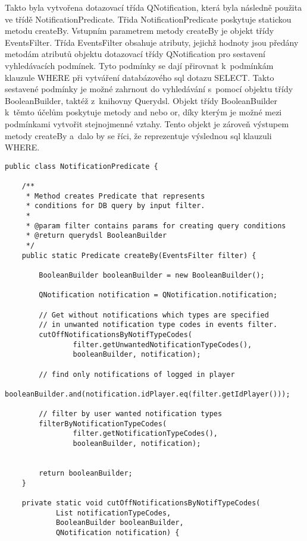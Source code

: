 \documentclass[12pt]{article}
\begin{document}
{Takto byla vytvořena dotazovací třída QNotification,
která byla následně použita ve třídě NotificationPredicate.
Třida NotificationPredicate poskytuje statickou metodu createBy.
Vstupním parametrem metody createBy je objekt třídy EventsFilter. 
Třída EventsFilter obsahuje atributy, jejichž hodnoty jsou předány metodám atributů objektu
dotazovací třídy QNotification pro sestavení vyhledávacích podmínek.
Tyto podmínky se dají přirovnat k~podmínkám klauzule WHERE při vytváření databázového sql dotazu SELECT.
Takto sestavené podmínky je možné zahrnout do vyhledávání s~pomocí objektu třídy BooleanBuilder, taktéž z~knihovny Querydsl.
Objekt třídy BooleanBuilder k~těmto účelům poskytuje metody and nebo or, 
díky kterým je možné mezi podmínkami vytvořit stejnojmenné vztahy.
Tento objekt je zároveň výstupem metody createBy a~dalo by se říci, že reprezentuje výslednou sql klauzuli WHERE.

\clearpage

\begin{lstlisting}
public class NotificationPredicate {

    /**
     * Method creates Predicate that represents
     * conditions for DB query by input filter.
     *
     * @param filter contains params for creating query conditions
     * @return querydsl BooleanBuilder
     */
    public static Predicate createBy(EventsFilter filter) {

        BooleanBuilder booleanBuilder = new BooleanBuilder();

        QNotification notification = QNotification.notification;

        // Get without notifications which types are specified
        // in unwanted notification type codes in events filter.
        cutOffNotificationsByNotifTypeCodes(
                filter.getUnwantedNotificationTypeCodes(),
                booleanBuilder, notification);

        // find only notifications of logged in player
        booleanBuilder.and(notification.idPlayer.eq(filter.getIdPlayer()));

        // filter by user wanted notification types
        filterByNotificationTypeCodes(
                filter.getNotificationTypeCodes(),
                booleanBuilder, notification);


        return booleanBuilder;
    }

    private static void cutOffNotificationsByNotifTypeCodes(
            List notificationTypeCodes,
            BooleanBuilder booleanBuilder,
            QNotification notification) {


\end{lstlisting}}
\end{document}
